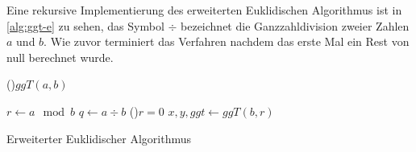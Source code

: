 \noindent
Eine rekursive Implementierung des erweiterten Euklidischen Algorithmus ist in
\autoref{alg:ggt-e} zu sehen, das Symbol $\div$ bezeichnet die Ganzzahldivision
zweier Zahlen $a$ und $b$.
Wie zuvor terminiert das Verfahren nachdem das erste
Mal ein Rest von null berechnet wurde.
\begin{algorithm}
  \DontPrintSemicolon
  \BlankLine
  \Fn(){$ggT(a,b)$}{
    $r \leftarrow a \mod{b}$\;
    $q \leftarrow a \div b$\;
    \If(){$r = 0$}{
    }
    $x,y,ggt \leftarrow ggT(b,r)$\;

  }
  \caption{Erweiterter Euklidischer Algorithmus}
  \label{alg:ggt-e}
\end{algorithm}
